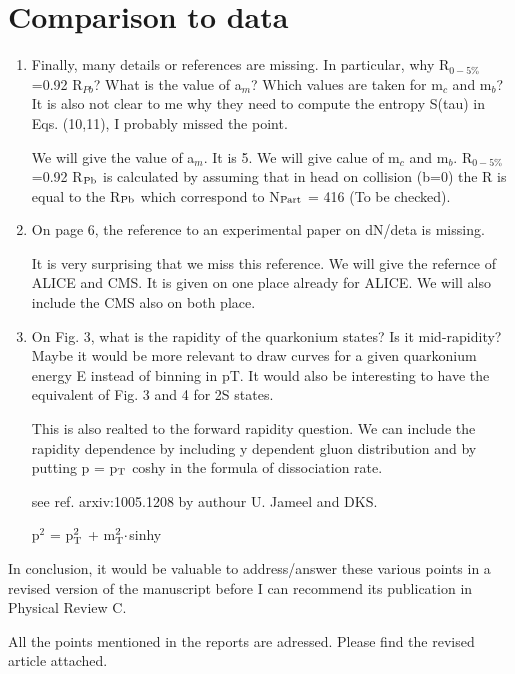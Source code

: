 \documentclass[aps,prc,preprint,superscriptaddress,showpacs,showkeys]{revtex4-1}
\begin{document}
\section{Comparison to data}
\begin{enumerate}

\item { \color{red} Finally, many details or references are missing. In particular, why
R$_{0-5\%}$=0.92 R$_{Pb}$? What is the value of a$_m$? Which values are taken
for m$_c$ and m$_b$? It is also not clear to me why they need to compute
the entropy S(tau) in Eqs. (10,11), I probably missed the point.}

{\color{blue} We will give the value of a$_m$. It is 5. We will give calue of m$_c$ and m$_b$.
R$_{0-5\%}$=0.92 R$_{\rm Pb}$ is calculated by assuming that in head on collision (b=0) the R is 
equal to the R$_{\rm Pb}$ which correspond to N$_{\rm Part}$ = 416 (To be checked). 
}


\item { \color{red} On page 6, the reference to an experimental paper on dN/deta is
missing.}

{\color{blue} It is very surprising that we miss this reference. We will give the refernce of ALICE and CMS. It is 
given on one place already for ALICE. We will also include the CMS also on both place.}


\item { \color{red} On Fig. 3, what is the rapidity of the quarkonium states? Is it
mid-rapidity? Maybe it would be more relevant to draw curves for a
given quarkonium energy E instead of binning in pT. It would also be
interesting to have the equivalent of Fig. 3 and 4 for 2S states.}

{\color{blue} This is also realted to the forward rapidity question. We can include the rapidity dependence by
including y dependent gluon distribution and by putting p = p$_{\rm T}$ coshy in the formula of dissociation rate.

see ref. arxiv:1005.1208 by authour U. Jameel and DKS.

p$^{2}$ = p$_{\rm T}^{2}$ + m$_{\rm T}^{2} \cdot$sinhy
}

\end{enumerate}

{ \color{red} In conclusion, it would be valuable to address/answer these various
points in a revised version of the manuscript before I can recommend
its publication in Physical Review C.}

{ \color{blue} All the points mentioned in the reports are adressed. Please find the revised 
article attached.} 
\end{document}
